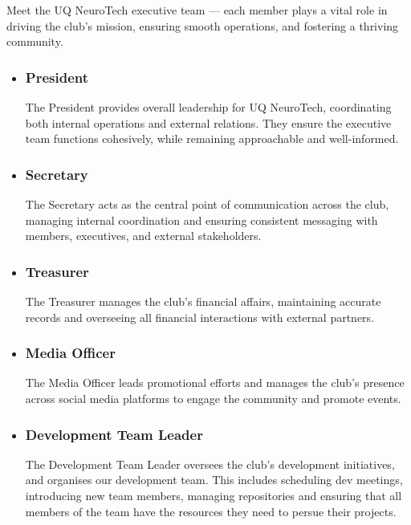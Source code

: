 \documentclass[a4paper,12pt]{report}
\begin{document}
Meet the UQ NeuroTech executive team — each member plays a vital role in driving the club’s mission, ensuring smooth operations, and fostering a thriving community.
\begin{itemize}
    \item \subsubsection{President}
    The President provides overall leadership for UQ NeuroTech, coordinating both internal operations and external relations. 
    They ensure the executive team functions cohesively, while remaining approachable and well-informed.

    \item \subsubsection{Secretary}
    The Secretary acts as the central point of communication across the club, managing internal coordination and 
    ensuring consistent messaging with members, executives, and external stakeholders.

    \item \subsubsection{Treasurer}
    The Treasurer manages the club’s financial affairs, maintaining accurate records and overseeing all financial 
    interactions with external partners.

    \item \subsubsection{Media Officer}
    The Media Officer leads promotional efforts and manages the club’s presence across social media 
    platforms to engage the community and promote events.

    \item \subsubsection{Development Team Leader}
    The Development Team Leader oversees the club's development initiatives, and organises our development team. 
    This includes scheduling dev meetings, introducing new team members, managing repositories and ensuring that all members of the team have 
    the resources they need to persue their projects.


\end{itemize}
\end{document}
